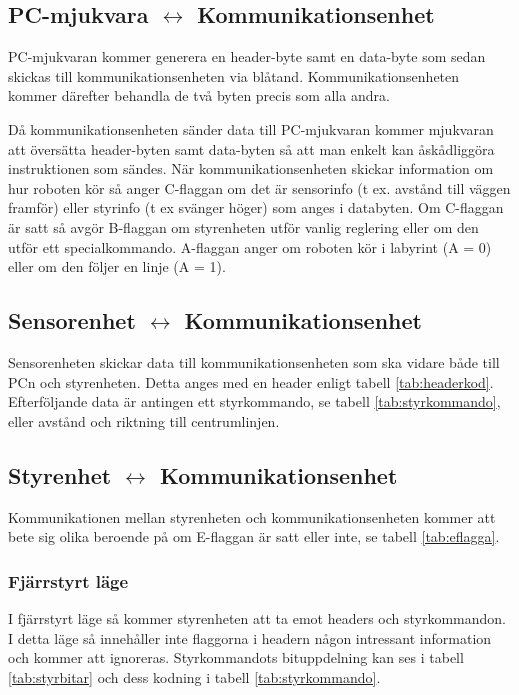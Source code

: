 \subsection{PC-mjukvara $\longleftrightarrow$ Kommunikationsenhet}
PC-mjukvaran kommer generera en header-byte samt en data-byte som sedan skickas
till kommunikationsenheten via blåtand. Kommunikationsenheten kommer därefter
behandla de två byten precis som alla andra.

Då kommunikationsenheten sänder data till PC-mjukvaran kommer mjukvaran att
översätta header-byten samt data-byten så att man enkelt kan åskådliggöra
instruktionen som sändes. När kommunikationsenheten skickar information om hur roboten kör
så anger C-flaggan om det är sensorinfo (t ex. avstånd till väggen framför) eller styrinfo (t ex svänger höger)
som anges i databyten. Om C-flaggan är satt så avgör B-flaggan om styrenheten utför vanlig reglering eller om
den utför ett specialkommando. A-flaggan anger om roboten kör i labyrint (A = 0) eller
om den följer en linje (A = 1).

\subsection{Sensorenhet $\longleftrightarrow$ Kommunikationsenhet}
Sensorenheten skickar data till kommunikationsenheten som ska vidare både till PCn och styrenheten. Detta anges med en header enligt tabell \ref{tab:headerkod}. Efterföljande data är antingen ett styrkommando, se tabell \ref{tab:styrkommando}, eller avstånd och riktning till centrumlinjen.

\subsection{Styrenhet $\longleftrightarrow$ Kommunikationsenhet}
Kommunikationen mellan styrenheten och kommunikationsenheten kommer att bete sig olika beroende på om E-flaggan
är satt eller inte, se tabell \ref{tab:eflagga}.

\subsubsection{Fjärrstyrt läge}
I fjärrstyrt läge så kommer styrenheten att ta emot headers och styrkommandon. I detta läge så 
innehåller inte flaggorna i headern någon intressant information och kommer att ignoreras. Styrkommandots bituppdelning kan ses i 
tabell \ref{tab:styrbitar} och dess kodning i tabell \ref{tab:styrkommando}.

